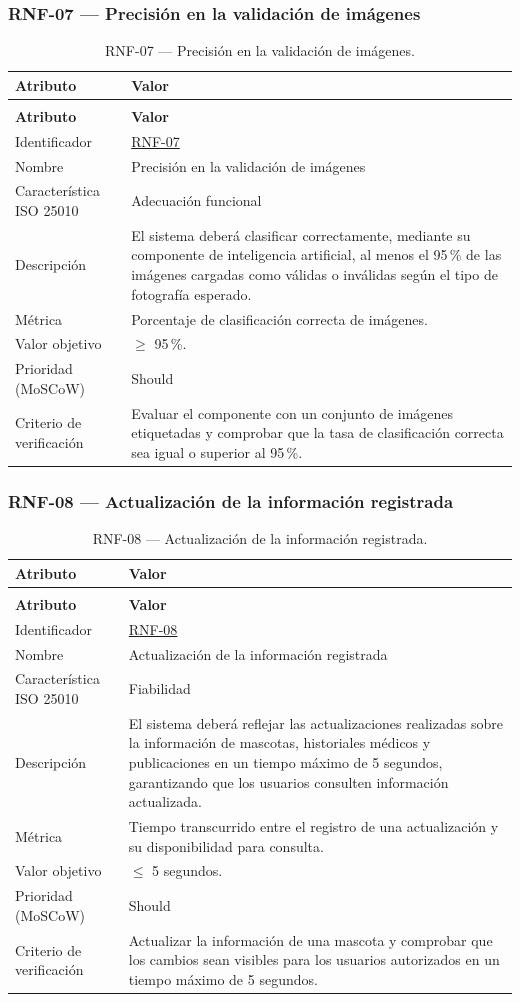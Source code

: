 \documentclass[journal,onecolumn]{IEEEtran}
\makeatletter
\newenvironment{atributos}[2]{%
	\small
	\begin{longtable}{@{}>{\raggedright\arraybackslash}p{4.2cm} >{\raggedright\arraybackslash}p{11.2cm}@{}}
		\caption{#2}\label{tab:#1}\\
		\toprule
		\textbf{Atributo} & \textbf{Valor} \\
		\midrule
		\endfirsthead
		\multicolumn{2}{@{}l}{\small\itshape (continuación)}\\
		\toprule
		\textbf{Atributo} & \textbf{Valor} \\
		\midrule
		\endhead
		\bottomrule
		\endlastfoot
	}{%
	\end{longtable}
	\normalsize
}
\makeatother
\begin{document}
	\subsubsection{RNF-07 --- Precisión en la validación de imágenes}
	
	\begin{atributos}{RNF-07}{RNF-07 --- Precisión en la validación de imágenes.}
		Identificador & \hyperref[tab:RNF-07]{RNF-07} \\
		Nombre & Precisión en la validación de imágenes \\
		Característica ISO 25010 & Adecuación funcional \\
		Descripción & El sistema deberá clasificar correctamente, mediante su componente de inteligencia artificial, al menos el 95\,\% de las imágenes cargadas como válidas o inválidas según el tipo de fotografía esperado. \\
		Métrica & Porcentaje de clasificación correcta de imágenes. \\
		Valor objetivo & $\geq$ 95\,\%. \\
		Prioridad (MoSCoW) & Should \\
		Criterio de verificación & Evaluar el componente con un conjunto de imágenes etiquetadas y comprobar que la tasa de clasificación correcta sea igual o superior al 95\,\%. \\
	\end{atributos}
	
	\subsubsection{RNF-08 --- Actualización de la información registrada}
	
	\begin{atributos}{RNF-08}{RNF-08 --- Actualización de la información registrada.}
		Identificador & \hyperref[tab:RNF-08]{RNF-08} \\
		Nombre & Actualización de la información registrada \\
		Característica ISO 25010 & Fiabilidad \\
		Descripción & El sistema deberá reflejar las actualizaciones realizadas sobre la información de mascotas, historiales médicos y publicaciones en un tiempo máximo de 5 segundos, garantizando que los usuarios consulten información actualizada. \\
		Métrica & Tiempo transcurrido entre el registro de una actualización y su disponibilidad para consulta. \\
		Valor objetivo & $\leq$ 5 segundos. \\
		Prioridad (MoSCoW) & Should \\
		Criterio de verificación & Actualizar la información de una mascota y comprobar que los cambios sean visibles para los usuarios autorizados en un tiempo máximo de 5 segundos. \\
	\end{atributos}
	
\end{document}

